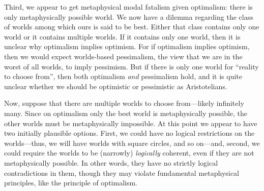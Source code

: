 Third, we appear to get metaphysical modal fatalism given optimalism: there is only metaphysically 
possible world. We now have a dilemma regarding the class of worlds among which ours is said to be best. Either that class
contains only one world or it contains multiple worlds. If it contains only one world, then it is unclear why optimalism
implies optimism. For if optimalism implies optimism, then we would expect worlds-based pessimalism, the view that we are 
in the worst of all worlds, to imply pessimism. But if there is only one world for ``reality to choose from'', then 
both optimalism \textit{and} pessimalism hold, and it is quite unclear whether we should be optimistic or pessimistic
as Aristotelians. 

Now, suppose that there are multiple worlds to choose from---likely infinitely many. Since on optimalism only the best world is 
metaphysically possible, the other worlds must be metaphysically impossible. At this point we appear to have two 
initially plausible options. First, we could have no logical restrictions on the worlds---thus, we will have worlds
with square circles, and so on---and, second, we could require the worlds to be (narrowly) \textit{logically} coherent, even if 
they are not metaphysically possible. In other words, they have no strictly logical contradictions in them, though they 
may violate fundamental metaphysical principles, like the principle of optimalism. 

